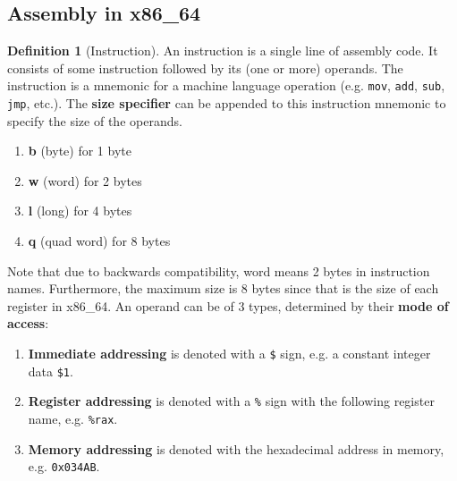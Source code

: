 \documentclass{article}
\theoremstyle{definition}
\newtheorem{definition}{Definition}[section]
\begin{document}
    

  \subsection{Assembly in x86\_64} 

    \begin{definition}[Instruction]
      An instruction is a single line of assembly code. It consists of some instruction followed by its (one or more) operands. The instruction is a mnemonic for a machine language operation (e.g. \texttt{mov}, \texttt{add}, \texttt{sub}, \texttt{jmp}, etc.). The \textbf{size specifier} can be appended to this instruction mnemonic to specify the size of the operands. 
      \begin{enumerate} 
        \item \textbf{b} (byte) for 1 byte 
        \item \textbf{w} (word) for 2 bytes
        \item \textbf{l} (long) for 4 bytes 
        \item \textbf{q} (quad word) for 8 bytes
      \end{enumerate}
      Note that due to backwards compatibility, word means 2 bytes in instruction names. Furthermore, the maximum size is 8 bytes since that is the size of each register in x86\_64. An operand can be of 3 types, determined by their \textbf{mode of access}:
      \begin{enumerate} 
        \item \textbf{Immediate addressing} is denoted with a \texttt{\$} sign, e.g. a constant integer data \texttt{\$1}. 
        \item \textbf{Register addressing} is denoted with a \texttt{\%} sign with the following register name, e.g. \texttt{\%rax}.
        \item \textbf{Memory addressing} is denoted with the hexadecimal address in memory, e.g. \texttt{0x034AB}.
      \end{enumerate}
    \end{definition}
\end{document}
